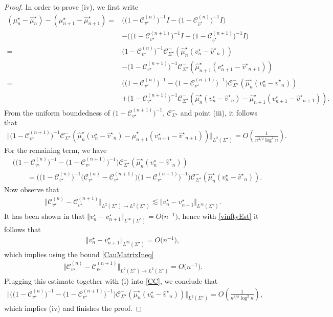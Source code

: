 \documentclass[11pt]{article}
\numberwithin{equation}{section}
\newcommand{\Id}{I}
\newcommand{\smu}{\mu^\star}
\newcommand{\shmu}{\widehat \mu^\star}
\newcommand{\bv}{v}
\newcommand{\hv}{{\widehat v}}
\newcommand{\sbv}{v^\star}
\newcommand{\shv}{{\widehat v^\star}}
\newcommand{\sCau}{\mathcal C_{\Sigma^\star}}
\newcommand{\sCauv}{\mathcal C_{\bv^\star}}
\newcommand{\sCauhv}{\mathcal C_{\hv^\star}}
\newcommand{\Sigr}{\Sigma^r}
\numberwithin{equation}{section}
\begin{document}
\begin{proof}
In order to prove (iv), we first write
\begin{align*}
 (\smu_n - \shmu_n)-(\smu_{n+1} - \shmu_{n+1})={}&\big(\big(1-\sCauv^{(n)}\big)^{-1} \Id - \big(1-\sCauhv^{(n)}\big)^{-1}\Id\big)
 \\
 &-\big(\big(1-\sCauv^{(n+1)}\big)^{-1} \Id - \big(1-\sCauhv^{(n+1)}\big)^{-1}\Id\big)
 \\
={}& \big(1-\sCauv^{(n)}\big)^{-1}\sCau^-(\shmu_n(\sbv_n-\shv_n))
 \\
 & -\big(1-\sCauv^{(n+1)}\big)^{-1}\sCau^-(\shmu_{n+1}(\sbv_{n+1}-\shv_{n+1}))
 \\
={}& \big(\big(1-\sCauv^{(n)}\big)^{-1}-\big(1-\sCauv^{(n+1)}\big)^{-1}\big)\sCau^-(\shmu_n(\sbv_n-\shv_n))
 \\
 & + \big(1-\sCauv^{(n+1)}\big)^{-1}\sCau^-(\shmu_n(\sbv_n-\shv_n)-\shmu_{n+1}(\sbv_{n+1}-\shv_{n+1})).
\end{align*}
From the uniform boundedness of $\big(1-\sCauv^{(n+1)}\big)^{-1}$, $\sCau^-$ and point (iii), it follows that
\begin{align*}
 \big\Vert \big(1-\sCauv^{(n+1)}\big)^{-1}\sCau^-(\shmu_n(\sbv_n-\shv_n)-\shmu_{n+1}(\sbv_{n+1}-\shv_{n+1})) \big\Vert_{L^2(\Sigma^\star)} = O\left(\frac{1}{n^{3/2}\log^2 n}\right).
\end{align*}
For the remaining term, we have
\begin{align}
 &\big(\big(1-\sCauv^{(n)}\big)^{-1}-\big(1-\sCauv^{(n+1)}\big)^{-1}\big)\sCau^-(\shmu_n(\sbv_n-\shv_n))\nonumber
 \\
 &\qquad= \big(\big(1-\sCauv^{(n)}\big)^{-1}\big(\sCauv^{(n)}-\sCauv^{(n+1)}\big)\big(1-\sCauv^{(n+1)}\big)^{-1}\big)\sCau^-(\shmu_n(\sbv_n-\shv_n)).\label{CC}
\end{align}
Now observe that
\begin{align}\label{CauMatrixIneq}
 \big\Vert \sCauv^{(n)}-\sCauv^{(n+1)} \big\Vert_{L^2(\Sigma^\star)\to L^2(\Sigma^\star)} \lesssim \Vert \sbv_n - \sbv_{n+1} \Vert_{L^\infty(\Sigma^\star)}.
\end{align}
It has been shown in \cite[p.~54]{CD} that $\Vert \sbv_n - \sbv_{n+1} \Vert_{L^\infty(\Sigr)}=O\big(n^{-1}\big)$, hence with \eqref{vinftyEst} it follows that
\begin{align*}
 \Vert \sbv_n - \sbv_{n+1} \Vert_{L^\infty(\Sigma^\star)} = O\big(n^{-1}\big),
\end{align*}
which implies using the bound \eqref{CauMatrixIneq}
\begin{align*}
 \big\Vert \sCauv^{(n)}-\sCauv^{(n+1)} \big\Vert_{L^2(\Sigma^\star)\to L^2(\Sigma^\star)} = O\big(n^{-1}\big).
\end{align*}
Plugging this estimate together with (i) into \eqref{CC}, we conclude that
\begin{align*}
 \big\Vert \big(\big(1-\sCauv^{(n)}\big)^{-1}-\big(1-\sCauv^{(n+1)}\big)^{-1}\big)\sCau^-(\shmu_n(\sbv_n-\shv_n))\big\Vert_{L^2(\Sigma^\star)} = O\left(\frac{1}{n^{3/2}\log^2 n}\right),
\end{align*}
which implies (iv) and finishes the proof.
\end{proof}
\end{document}

